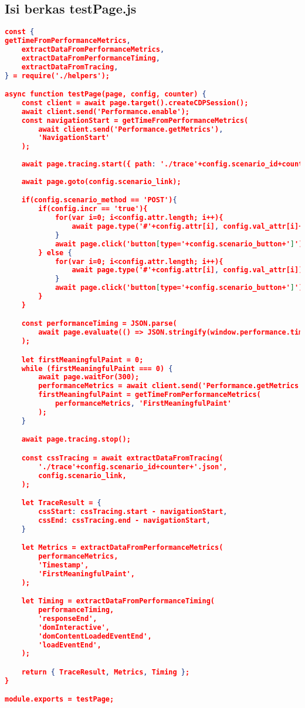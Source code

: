 	\subsection*{Isi berkas testPage.js}
\begin{lstlisting}[frame=single,tabsize=2,breaklines,caption={Isi berkas testPage.js},label=testjs, captionpos=b, language=json]
const {
getTimeFromPerformanceMetrics,
	extractDataFromPerformanceMetrics,
	extractDataFromPerformanceTiming,
	extractDataFromTracing,
} = require('./helpers');

async function testPage(page, config, counter) {
	const client = await page.target().createCDPSession();
	await client.send('Performance.enable');
	const navigationStart = getTimeFromPerformanceMetrics(
		await client.send('Performance.getMetrics'),
		'NavigationStart'
	);
	
	await page.tracing.start({ path: './trace'+config.scenario_id+counter+'.json' });
	
	await page.goto(config.scenario_link);

	if(config.scenario_method == 'POST'){
		if(config.incr == 'true'){
			for(var i=0; i<config.attr.length; i++){
				await page.type('#'+config.attr[i], config.val_attr[i]+counter);
			}
			await page.click('button[type='+config.scenario_button+']');
		} else {
			for(var i=0; i<config.attr.length; i++){
				await page.type('#'+config.attr[i], config.val_attr[i]);
			}
			await page.click('button[type='+config.scenario_button+']');
		} 
	}

	const performanceTiming = JSON.parse(
		await page.evaluate(() => JSON.stringify(window.performance.timing))
	);

	let firstMeaningfulPaint = 0;
	while (firstMeaningfulPaint === 0) {
		await page.waitFor(300);
		performanceMetrics = await client.send('Performance.getMetrics');
		firstMeaningfulPaint = getTimeFromPerformanceMetrics(
			performanceMetrics, 'FirstMeaningfulPaint'
		);
	}

	await page.tracing.stop();

	const cssTracing = await extractDataFromTracing(
		'./trace'+config.scenario_id+counter+'.json',
		config.scenario_link,
	);

	let TraceResult = {
		cssStart: cssTracing.start - navigationStart,
		cssEnd: cssTracing.end - navigationStart,
	}

	let Metrics = extractDataFromPerformanceMetrics(
		performanceMetrics,
		'Timestamp',
		'FirstMeaningfulPaint',
	);

	let Timing = extractDataFromPerformanceTiming(
		performanceTiming,
		'responseEnd',
		'domInteractive',
		'domContentLoadedEventEnd',
		'loadEventEnd',
	);

	return { TraceResult, Metrics, Timing };
}

module.exports = testPage;
\end{lstlisting}

